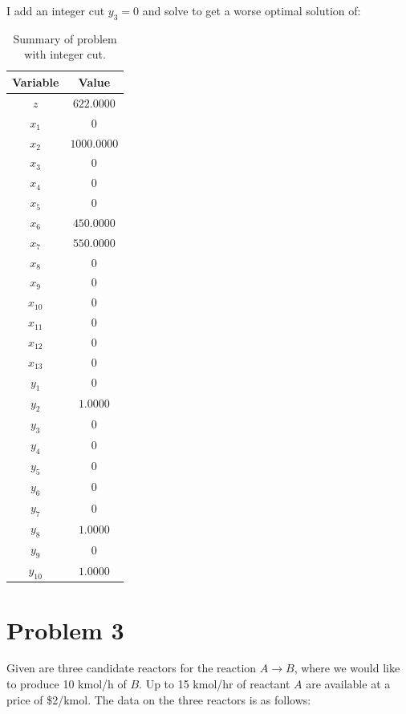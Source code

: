 \documentclass[11pt]{article}
\begin{document}
I add an integer cut $y_3=0$ and solve to get a worse optimal solution of:

\begin{table}[htbp]
\centering
\begin{tabular}{|c|c|}
\hline
\textbf{Variable} & \textbf{Value} \\ \hline
$z$ & $622.0000$ \\ \hline
$x_1$ & $0$ \\ \hline
$x_2$ & $1000.0000$ \\ \hline
$x_3$ & $0$ \\ \hline
$x_4$ & $0$ \\ \hline
$x_5$ & $0$ \\ \hline
$x_6$ & $450.0000$ \\ \hline
$x_7$ & $550.0000$ \\ \hline
$x_8$ & $0$ \\ \hline
$x_9$ & $0$ \\ \hline
$x_{10}$ & $0$ \\ \hline
$x_{11}$ & $0$ \\ \hline
$x_{12}$ & $0$ \\ \hline
$x_{13}$ & $0$ \\ \hline
$y_1$ & $0$ \\ \hline
$y_2$ & $1.0000$ \\ \hline
$y_3$ & $0$ \\ \hline
$y_4$ & $0$ \\ \hline
$y_5$ & $0$ \\ \hline
$y_6$ & $0$ \\ \hline
$y_7$ & $0$ \\ \hline
$y_8$ & $1.0000$ \\ \hline
$y_9$ & $0$ \\ \hline
$y_{10}$ & $1.0000$ \\ \hline
\end{tabular}
\caption{Summary of problem with integer cut.}
\label{tab:variable_summary}
\end{table}
\clearpage
\section{Problem 3}
\label{prob3}

Given are three candidate reactors for the reaction \( A \rightarrow B \), where we would like to produce 10 kmol/h of \( B \). Up to 15 kmol/hr of reactant \( A \) are available at a price of \$2/kmol. The data on the three reactors is as follows:
\end{document}
